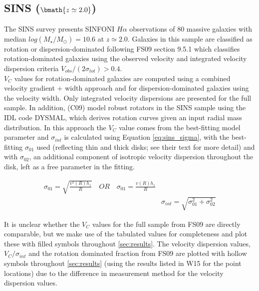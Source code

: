 \documentclass[fleqn,usenatbib]{mnras}
\begin{document}
\subsection{SINS ($\bmath{z\simeq2.0}$)}\label{subsec:SINS}
The SINS survey \citep[FS09]{ForsterSchreiber2009} presents SINFONI $H\alpha$ observations of 80 massive galaxies with median $log(M_{\star}/M_{\odot})=10.6$ at $z\simeq2.0$.
Galaxies in this sample are classified as rotation or dispersion-dominated following FS09 section 9.5.1 which classifies rotation-dominated galaxies using the observed velocity and integrated velocity dispersion criteria $V_{obs}/(2\sigma_{tot}) > 0.4$. \\

\noindent
$V_{C}$ values for rotation-dominated galaxies are computed using a combined velocity gradient + width approach \citep{ForsterSchreiber2006} and for dispersion-dominated galaxies using the velocity width.
Only integrated velocity dispersions are presented for the full sample.
In addition, \cite{Cresci2009} (C09) model robust rotators in the SINS sample using the IDL code DYSMAL, which derives rotation curves given an input radial mass distribution.
In this approach the $V_{C}$ value comes from the best-fitting model parameter and $\sigma_{int}$ is calculated using Equation \ref{eq:sins_sigma}, with the best-fitting $\sigma_{01}$ used (reflecting thin and thick disks; see their text for more detail) and with $\sigma_{02}$, an additional component of isotropic velocity dispersion throughout the disk, left as a free parameter in the fitting.

\begin{equation}\label{eq:sins_sigma}
\begin{split}
\sigma_{01} = \sqrt{\frac{v^{2}(R)h_{z}}{R}} \quad OR \quad \sigma_{01} = \frac{v(R)h_{z}}{R} \\
& \sigma_{int} = \sqrt{\sigma_{01}^{2} + \sigma_{02}^{2}}
\end{split}
\end{equation}

\noindent
It is unclear whether the $V_{C}$ values for the full sample from FS09 are directly comparable, but we make use of the tabulated values for completeness and plot these with filled symbols throughout \cref{sec:results}.
The velocity dispersion values, $V_{C}/\sigma_{int}$ and the rotation dominated fraction from FS09 are plotted with hollow symbols throughout \cref{sec:results} (using the results listed in W15 for the point locations) due to the difference in measurement method for the velocity dispersion values.
\end{document}
